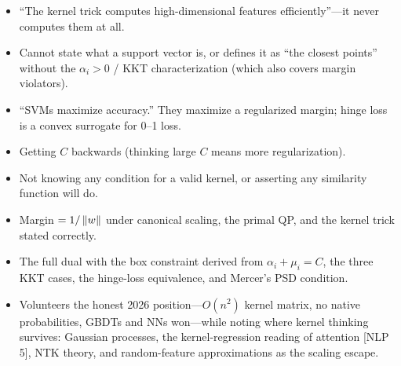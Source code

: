 \begin{interviewq}
\redflags
\begin{itemize}
    \item ``The kernel trick computes high-dimensional features efficiently''---it never computes them at all.
    \item Cannot state what a support vector is, or defines it as ``the closest points'' without the $\alpha_i>0$ / KKT characterization (which also covers margin violators).
    \item ``SVMs maximize accuracy.'' They maximize a regularized margin; hinge loss is a convex surrogate for 0--1 loss.
    \item Getting $C$ backwards (thinking large $C$ means more regularization).
    \item Not knowing any condition for a valid kernel, or asserting any similarity function will do.
\end{itemize}


\goodgreat
\begin{itemize}
    \item {} Margin $=1/\left\lVert w\right\rVert$ under canonical scaling, the primal QP, and the kernel trick stated correctly.
    \item {} The full dual with the box constraint derived from $\alpha_i+\mu_i=C$, the three KKT cases, the hinge-loss equivalence, and Mercer's PSD condition.
    \item {} Volunteers the honest 2026 position---$O(n^2)$ kernel matrix, no native probabilities, GBDTs and NNs won---while noting where kernel thinking survives: Gaussian processes, the kernel-regression reading of attention [NLP 5], NTK theory, and random-feature approximations as the scaling escape.
\end{itemize}

\end{interviewq}


